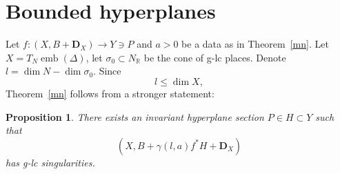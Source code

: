 \documentclass[12pt,twoside]{amsart}
\newcommand{\R}{{\mathbb R}}
\newcommand{\bD}{{\mathbf D}}
\newcommand{\emb}{\operatorname{emb}}
\theoremstyle{plain}
\newtheorem{prop}[thm]{Proposition}
\theoremstyle{definition}
\theoremstyle{remark}
\begin{document}

\section{Bounded hyperplanes}


Let $f\colon (X,B+\bD_X)\to Y\ni P$ and $a>0$ be a data as in Theorem~\ref{mn}.
Let $X=T_N\emb(\Delta)$, let $\sigma_0\subset N_\R$ be the cone of g-lc places.
Denote $l=\dim N-\dim \sigma_0$. Since
$$ 
l\le \dim X,
$$ 
Theorem~\ref{mn} follows from a stronger statement:

\begin{prop}
	There exists an invariant hyperplane section $P\in H\subset Y$ such that 
	$$(X,B+\gamma(l,a)f^*H+\bD_X)$$ has g-lc singularities.
\end{prop}
\end{document}
